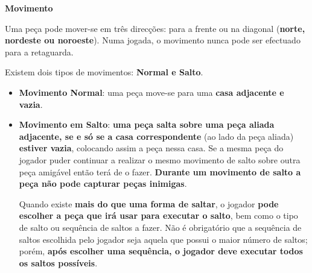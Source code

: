 \documentclass[a4paper]{article}
\begin{document}
\large{\textbf{Movimento}}
\begin{small}

Uma peça pode mover-se em três direcções: para a frente ou na diagonal (\textbf{norte, nordeste ou noroeste}). Numa jogada, o movimento nunca pode ser efectuado para a retaguarda. 

Existem dois tipos de movimentos: \textbf{Normal e Salto}. 
\begin{itemize}
\item \textbf{Movimento Normal}:
uma peça move-se para uma \textbf{casa adjacente e vazia}. 
\item \textbf{Movimento em Salto}:
\textbf{uma peça salta sobre uma peça aliada adjacente, se e só se a casa correspondente} (ao lado da peça aliada) \textbf{estiver vazia}, colocando assim a peça nessa casa. Se a mesma peça do jogador puder continuar a realizar o mesmo movimento de salto sobre outra peça amigável então terá de o fazer. \textbf{Durante um movimento de salto a peça não pode capturar peças inimigas}.

Quando existe \textbf{mais do que uma forma de saltar}, o jogador \textbf{pode escolher a peça que irá usar para executar o salto}, bem como o tipo de salto ou sequência de saltos a fazer. Não é obrigatório que a sequência de saltos escolhida pelo jogador seja aquela que possui o maior número de saltos; porém, \textbf{após escolher uma sequência, o jogador deve executar todos os saltos possíveis}.
\end{itemize}
\end{small}
\end{document}
